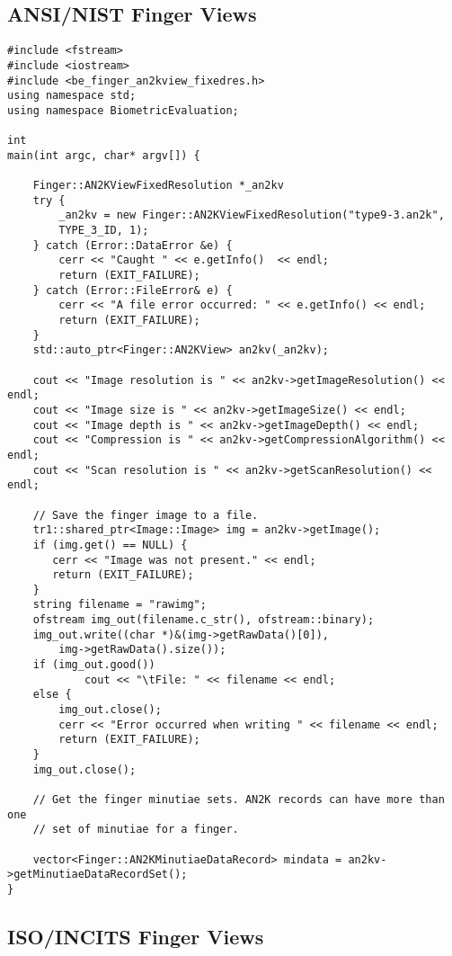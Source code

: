 \subsection{ANSI/NIST Finger Views}

\begin{lstlisting}[caption={Using an AN2K Finger View}, label=an2kfingerviewuse]
#include <fstream>
#include <iostream>
#include <be_finger_an2kview_fixedres.h>
using namespace std;
using namespace BiometricEvaluation;

int
main(int argc, char* argv[]) {

    Finger::AN2KViewFixedResolution *_an2kv
    try {
        _an2kv = new Finger::AN2KViewFixedResolution("type9-3.an2k",
	    TYPE_3_ID, 1);
    } catch (Error::DataError &e) {
        cerr << "Caught " << e.getInfo()  << endl;
        return (EXIT_FAILURE);
    } catch (Error::FileError& e) {
        cerr << "A file error occurred: " << e.getInfo() << endl;
        return (EXIT_FAILURE);
    }
    std::auto_ptr<Finger::AN2KView> an2kv(_an2kv);

    cout << "Image resolution is " << an2kv->getImageResolution() << endl;
    cout << "Image size is " << an2kv->getImageSize() << endl;
    cout << "Image depth is " << an2kv->getImageDepth() << endl;
    cout << "Compression is " << an2kv->getCompressionAlgorithm() << endl;
    cout << "Scan resolution is " << an2kv->getScanResolution() << endl;

    // Save the finger image to a file.
    tr1::shared_ptr<Image::Image> img = an2kv->getImage();
    if (img.get() == NULL) {
       cerr << "Image was not present." << endl;
       return (EXIT_FAILURE);
    }
    string filename = "rawimg";
    ofstream img_out(filename.c_str(), ofstream::binary);
    img_out.write((char *)&(img->getRawData()[0]),
        img->getRawData().size());
    if (img_out.good())
            cout << "\tFile: " << filename << endl;
    else {
        img_out.close();
        cerr << "Error occurred when writing " << filename << endl;
        return (EXIT_FAILURE);
    }
    img_out.close();

    // Get the finger minutiae sets. AN2K records can have more than one
    // set of minutiae for a finger.

    vector<Finger::AN2KMinutiaeDataRecord> mindata = an2kv->getMinutiaeDataRecordSet();
}
\end{lstlisting}

\subsection{ISO/INCITS Finger Views}
